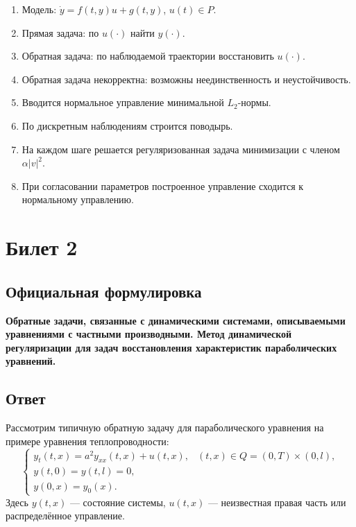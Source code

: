 \documentclass[12pt,a4paper]{article}
\begin{document}
\begin{enumerate}
    \item Модель: $\dot y=f(t,y)u+g(t,y)$, $u(t)\in P$.
    \item Прямая задача: по $u(\cdot)$ найти $y(\cdot)$.
    \item Обратная задача: по наблюдаемой траектории восстановить $u(\cdot)$.
    \item Обратная задача некорректна: возможны неединственность и неустойчивость.
    \item Вводится нормальное управление минимальной $L_2$-нормы.
    \item По дискретным наблюдениям строится поводырь.
    \item На каждом шаге решается регуляризованная задача минимизации с членом $\alpha |v|^2$.
    \item При согласовании параметров построенное управление сходится к нормальному управлению.
\end{enumerate}

\section{Билет 2}

\subsection*{Официальная формулировка}

\textbf{Обратные задачи, связанные с динамическими системами, описываемыми уравнениями с частными производными. Метод динамической регуляризации для задач восстановления характеристик параболических уравнений.}

\subsection*{Ответ}

Рассмотрим типичную обратную задачу для параболического уравнения на примере уравнения теплопроводности:
\begin{equation}
\begin{cases}
    y_t(t,x)=a^2y_{xx}(t,x)+u(t,x), &(t,x)\in Q=(0,T)\times(0,l),\\
    y(t,0)=y(t,l)=0,\\
    y(0,x)=y_0(x).
\end{cases}
\end{equation}
Здесь $y(t,x)$ --- состояние системы, $u(t,x)$ --- неизвестная правая часть или распределённое управление.
\end{document}
